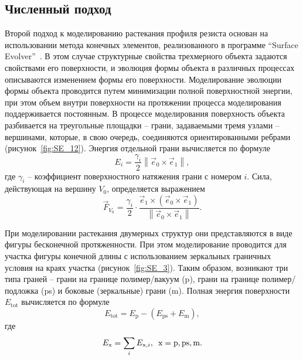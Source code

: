 \subsection{Численный подход}
Второй подход к моделированию растекания профиля резиста основан на использовании метода конечных элементов, реализованного в программе ``Surface Evolver''~\cite{Brakke_SE}.
В этом случае структурные свойства трехмерного объекта задаются свойствами его поверхности, и эволюция формы объекта в различных процессах описываются изменением формы его поверхности.
Моделирование эволюции формы объекта проводится путем минимизации полной поверхностной энергии, при этом объем внутри поверхности на протяжении процесса моделирования поддерживается постоянным.
В процессе моделирования поверхность объекта разбивается на треугольные площадки -- грани, задаваемыми тремя узлами -- вершинами, которые, в свою очередь, соединяются ориентированными ребрами (рисунок~\ref{fig:SE_12}).
Энергия отдельной грани вычисляется по формуле
\begin{equation}
	E_i=\frac{\gamma_i}{2}\left\|\vec{e}_0 \times \vec{e}_1\right\|,
\end{equation}
где $\gamma_i$ -- коэффициент поверхностного натяжения грани с номером $i$. Сила, действующая на вершину $V_0$, определяется выражением
\begin{equation}
	\vec{F}_{V_0}=\frac{\gamma_i}{2} \cdot \frac{\vec{e}_1 \times\left(\vec{e}_0 \times \vec{e}_1\right)}{\left\|\vec{e}_0 \times \vec{e}_1\right\|}.
\end{equation}

При моделировании растекания двумерных структур они представляются в виде фигуры бесконечной протяженности. При этом моделирование проводится для участка фигуры конечной длины с использованием зеркальных граничных условия на краях участка (рисунок~\ref{fig:SE_3}). Таким образом, возникают три типа граней -- грани на границе полимер/вакуум (p), грани на границе полимер/подложка (ps) и боковые (зеркальные) грани (m). Полная энергия поверхности $E_\mathrm{tot}$ вычисляется по формуле
\begin{equation}
	E_\mathrm{tot} = E_\mathrm{p} - (E_\mathrm{ps} + E_\mathrm{m}),
\end{equation}
где 
\begin{equation}
	E_\mathrm{x} = \sum_{i} E_{\mathrm{x},i}, \hspace{0.5em} \mathrm{x} = \mathrm{p}, \mathrm{ps}, \mathrm{m}.
\end{equation}

